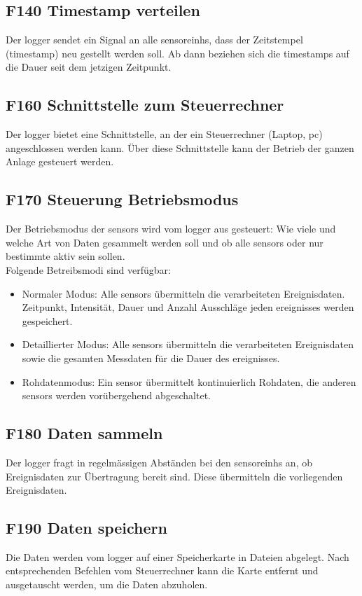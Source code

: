 \subsection{F140 Timestamp verteilen}
Der \gls{logger} sendet ein Signal an alle \glspl{sensoreinh}, dass der Zeitstempel (\gls{timestamp}) neu gestellt werden soll. Ab dann beziehen sich die \gls{timestamp}s auf die Dauer seit dem jetzigen Zeitpunkt.


\subsection{F160 Schnittstelle zum Steuerrechner}
Der \gls{logger} bietet eine Schnittstelle, an der ein Steuerrechner (Laptop, \gls{pc}) angeschlossen werden kann. Über diese Schnittstelle kann der Betrieb der ganzen Anlage gesteuert werden.


\subsection{F170 Steuerung Betriebsmodus}
Der Betriebsmodus der \glspl{sensor} wird vom \gls{logger} aus gesteuert: Wie viele und welche Art von Daten gesammelt werden soll und ob alle \glspl{sensor} oder nur bestimmte aktiv sein sollen. \\
Folgende Betreibsmodi sind verfügbar:
\begin{itemize}
\item Normaler Modus: Alle \glspl{sensor} übermitteln die verarbeiteten Ereignisdaten. Zeitpunkt, Intensität, Dauer und Anzahl Ausschläge jeden \gls{ereignis}ses werden gespeichert.
\item Detaillierter Modus: Alle \glspl{sensor} übermitteln die verarbeiteten Ereignisdaten sowie die gesamten Messdaten für die Dauer des \gls{ereignis}ses.
\item Rohdatenmodus: Ein \gls{sensor} übermittelt kontinuierlich Rohdaten, die anderen \glspl{sensor} werden vorübergehend abgeschaltet.
\end{itemize}


\subsection{F180 Daten sammeln}
Der \gls{logger} fragt in regelmässigen Abständen bei den \glspl{sensoreinh} an, ob Ereignisdaten zur Übertragung bereit sind. Diese übermitteln die vorliegenden Ereignisdaten.


\subsection{F190 Daten speichern}
Die Daten werden vom \gls{logger} auf einer Speicherkarte in Dateien abgelegt. Nach entsprechenden Befehlen vom Steuerrechner kann die Karte entfernt und ausgetauscht werden, um die Daten abzuholen.



